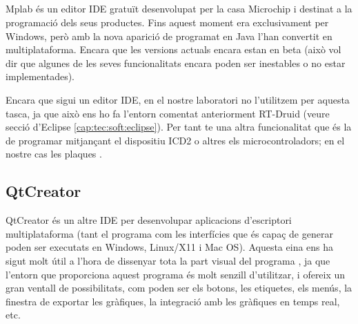 
\subsection{\MplabX}\label{cap:tec:soft:mplab}


Mplab és un editor IDE gratuït desenvolupat per la casa Microchip i destinat a la programació dels seus productes. Fins aquest moment era exclusivament per Windows, però amb la nova aparició de \MplabX programat en Java l'han convertit en multiplataforma. Encara que les versions actuals encara estan en beta (això vol dir que algunes de les seves funcionalitats encara poden ser inestables o no estar implementades).


Encara que sigui un editor IDE, en el nostre laboratori no l'utilitzem per aquesta tasca, ja que això ens ho fa l'entorn comentat anteriorment RT-Druid (veure secció d'Eclipse \ref{cap:tec:soft:eclipse}). Per tant te una altra funcionalitat que és la de programar mitjançant el dispositiu ICD2 o altres els microcontroladors; en el nostre cas les plaques \FLEX.


\subsection{QtCreator}\label{cap:tec:soft:qtcreator}


QtCreator és un altre IDE per desenvolupar aplicacions d'escriptori multiplataforma (tant el programa com les interfícies que és capaç de generar poden ser executats en Windows, Linux/X11 i Mac OS). Aquesta eina ens ha sigut molt útil a l'hora de dissenyar tota la part visual del programa \DCSMonitor, ja que l'entorn que proporciona aquest programa és molt senzill d'utilitzar, i ofereix un gran ventall de possibilitats, com poden ser els botons, les etiquetes, els menús, la finestra de exportar les gràfiques, la integració amb les gràfiques en temps real, etc.

